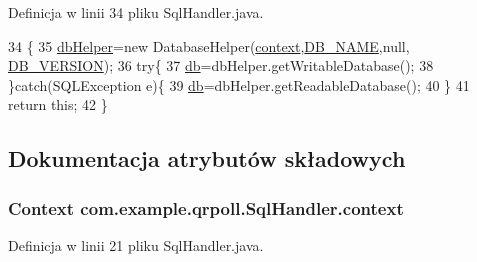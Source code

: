 Definicja w linii 34 pliku Sql\+Handler.\+java.


\begin{DoxyCode}
34                                 \{
35             \hyperlink{classcom_1_1example_1_1qrpoll_1_1_sql_handler_a70cd37adedee066fc05708b0990c4f6c}{dbHelper}=\textcolor{keyword}{new} DatabaseHelper(\hyperlink{classcom_1_1example_1_1qrpoll_1_1_sql_handler_ab0071f750233a8b37790758a430d847c}{context},\hyperlink{classcom_1_1example_1_1qrpoll_1_1_sql_handler_a1e5b9131804451b9c7e6e9cd0eeb7187}{DB\_NAME},null,
      \hyperlink{classcom_1_1example_1_1qrpoll_1_1_sql_handler_a10db6c9a4c952c10c3e67c633797a244}{DB\_VERSION});
36             \textcolor{keywordflow}{try}\{
37                 \hyperlink{classcom_1_1example_1_1qrpoll_1_1_sql_handler_a5b422e7952698eb1df158709d4e18007}{db}=dbHelper.getWritableDatabase();
38             \}\textcolor{keywordflow}{catch}(SQLException e)\{
39                 \hyperlink{classcom_1_1example_1_1qrpoll_1_1_sql_handler_a5b422e7952698eb1df158709d4e18007}{db}=dbHelper.getReadableDatabase();
40             \}
41             \textcolor{keywordflow}{return} \textcolor{keyword}{this};
42         \}
\end{DoxyCode}


\subsection{Dokumentacja atrybutów składowych}
\hypertarget{classcom_1_1example_1_1qrpoll_1_1_sql_handler_ab0071f750233a8b37790758a430d847c}{
\subsubsection[{context}]{\setlength{\rightskip}{0pt plus 5cm}Context com.\+example.\+qrpoll.\+Sql\+Handler.\+context\hspace{0.3cm}{\ttfamily [private]}}}\label{classcom_1_1example_1_1qrpoll_1_1_sql_handler_ab0071f750233a8b37790758a430d847c}


Definicja w linii 21 pliku Sql\+Handler.\+java.

